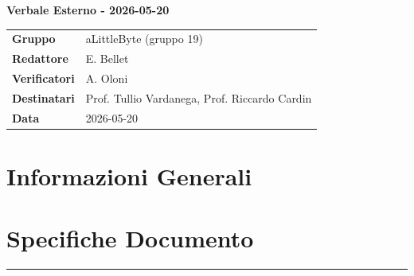 \documentclass[a4paper,12pt]{article}
\begin{document}
\thispagestyle{firstpage}

\vspace*{0.5cm}

\begin{center}
    {\LARGE \textbf{Verbale Esterno - 2026-05-20}}
\end{center}

\vspace{1.5cm}

\begin{center}
    \renewcommand{\arraystretch}{1.3}
    \begin{tcolorbox}[
        width=0.92\textwidth,
        colback=gray!6,
        colframe=gray!45,
        boxrule=0.5pt,
        arc=2mm,
        boxsep=0pt,
        left=8pt, right=8pt, top=8pt, bottom=8pt
    ]
        \begin{tabularx}{\linewidth}{>{\bfseries}p{3.5cm} X}
            Gruppo      & aLittleByte (gruppo 19) \\
            Redattore   & E. Bellet \\
            Verificatori& A. Oloni\\
            Destinatari & Prof. Tullio Vardanega, Prof. Riccardo Cardin \\
            Data        & 2026-05-20\\
        \end{tabularx}
    \end{tcolorbox}
\end{center}

\newpage

\tableofcontents
\newpage

\section{Informazioni Generali}
\section*{Specifiche Documento}
\hrule
\vspace{1cm}
\end{document}
